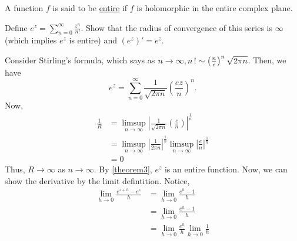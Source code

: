 \documentclass[11pt]{article}
\begin{document}
\begin{definition}
A function $f$ is said to be \underline{entire} if $f$ is holomorphic in the
entire complex plane.
\end{definition}
\begin{example}
Define $\displaystyle e^z = \sum^\infty_{n=0}\frac{z^n}{n!}$. Show that the
radius of convergence of this series is $\infty$ (which implies $e^z$ is entire)
and $(e^z)' = e^z$.
\end{example}
Consider Stirling's formula, which says as $n\to\infty, n\operatorname{!} \sim
\left(\frac{n}{e}\right)^n\sqrt{2\pi n}$. Then, we have
\begin{equation*}
e^z = \sum^\infty_{n=0} \frac{1}{\sqrt{2\pi n}}\left( \frac{ez}{n}\right)^n.
\end{equation*}
Now,
\begin{align*}
\frac{1}{R}
&= \limsup_{n\to\infty}\left| \frac{1}{\sqrt{2\pi
n}}\left(\frac{e}{n}\right)\right|^{\frac{1}{n}}\\
&= \limsup_{n\to\infty}\left| \frac{1}{2\pi n} \right|^{\frac{1}{n}}
\limsup_{n\to\infty}\left| \frac{e}{n} \right|^{\frac{1}{n}}\\
&= 0
\end{align*}
Thus, $R \to \infty$ as $n \to \infty$. By \cref{theorem3}, $e^z$ is an entire
function. Now, we can show the derivative by the limit defintition. Notice,
\begin{align*}
\lim_{h \to 0}\frac{e^{z+h} - e^z}{h}
&= \lim_{h \to 0}\frac{e^{h} - 1}{h}\\
&= \lim_{h \to 0}\frac{e^{h} - 1}{h}\\
&= \lim_{h \to 0}\frac{e^{h}}{h}\lim_{h \to 0}\frac{1}{h}\\
\end{align*}
\end{document}
